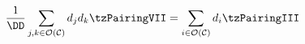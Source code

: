 \documentclass[border=3pt]{standalone}
\begin{document}
$\displaystyle
\frac{1}{\DD}\sum_{j,k\in \OC}d_{j}d_{k}\tzPairingVII
=
\sum_{i\in \OC}d_{i}\tzPairingIII
$
\end{document}
